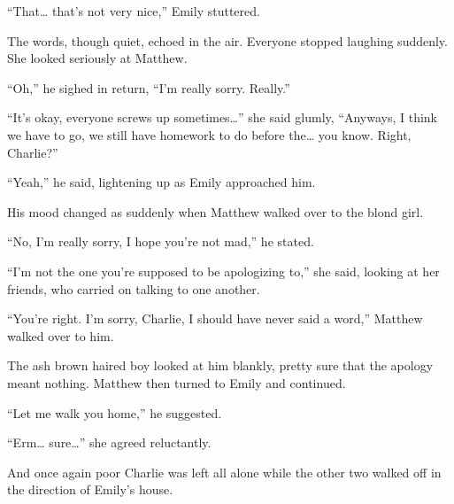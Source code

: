 “That… that’s not very nice,” Emily stuttered.

The words, though quiet, echoed in the air. Everyone stopped laughing suddenly. She looked seriously at Matthew.

“Oh,” he sighed in return, “I’m really sorry. Really.”

“It’s okay, everyone screws up sometimes…” she said glumly, “Anyways, I think we have to go, we still have homework to do before the… you know. Right, Charlie?”

“Yeah,” he said, lightening up as Emily approached him.

His mood changed as suddenly when Matthew walked over to the blond girl.

“No, I’m really sorry, I hope you’re not mad,” he stated.

“I’m not the one you’re supposed to be apologizing to,” she said, looking at her friends, who carried on talking to one another.

“You’re right. I’m sorry, Charlie, I should have never said a word,” Matthew walked over to him.

The ash brown haired boy looked at him blankly, pretty sure that the apology meant nothing. Matthew then turned to Emily and continued.

“Let me walk you home,” he suggested.

“Erm… sure…” she agreed reluctantly.

And once again poor Charlie was left all alone while the other two walked off in the direction of Emily’s house.